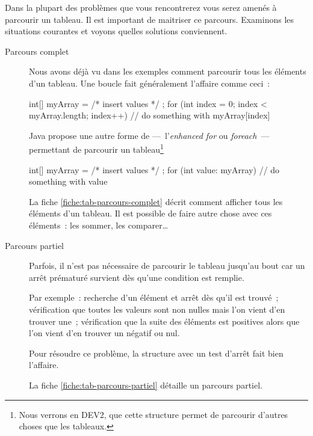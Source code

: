 		Dans la plupart des problèmes que vous rencontrerez vous serez amenés
		à parcourir un tableau.  Il est important de maitriser ce parcours.
		Examinons les situations courantes et voyons quelles solutions
		conviennent.
	
		\begin{description}

			\item[Parcours complet]
		
			Nous avons déjà vu dans les exemples comment parcourir tous les
			éléments d’un tableau.  Une boucle  fait généralement
			l'affaire comme ceci~:

			\begin{java}
int[] myArray = { /* insert values */ };
for (int index = 0; index < myArray.length; index++){
	// do something with myArray[index]
}
			\end{java}

			Java propose une autre forme de  —~l'\textit{enhanced for}
			ou \textit{foreach}~— permettant de parcourir un
			tableau\footnote{Nous verrons en DEV2, que cette structure permet
			de parcourir d'autres choses que les tableaux.}

			\begin{java}
int[] myArray = { /* insert values */ };
for (int value: myArray){
	// do something with value
}
			\end{java}
			
			La fiche \vref{fiche:tab-parcours-complet} décrit
			comment afficher tous les éléments d’un tableau.  Il est possible de
			faire autre chose avec ces éléments~: les sommer, les comparer\dots

			\item[Parcours partiel]
		
			Parfois, il n'est pas nécessaire de parcourir le tableau jusqu’au
			bout car un arrêt prématuré survient dès qu'une condition est
			remplie. 
			
			Par exemple~: recherche d'un élément et arrêt dès qu'il est trouvé~;
			vérification que toutes les valeurs sont non nulles mais l'on vient
			d'en trouver une~; vérification que la suite des éléments est
			positives alors que l'on vient d'en trouver un négatif ou nul.
	
			Pour résoudre ce problème, la structure  avec un test
			d'arrêt fait bien l'affaire. 
			
			La fiche \vref{fiche:tab-parcours-partiel} détaille un parcours
			partiel.
	
		\end{description}
	
